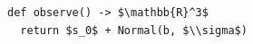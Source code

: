 \documentclass[border=10pt]{standalone}
\begin{document}
\begin{lstlisting}
def observe() -> $\mathbb{R}^3$
  return $s_0$ + Normal(b, $\\sigma$)
\end{lstlisting}
\end{document}
